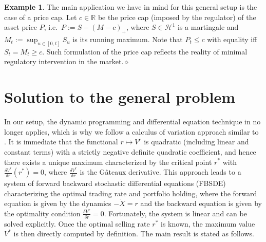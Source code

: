 \documentclass[openany,oneside]{article}
\theoremstyle{definition}
\newtheorem{eg}[thm]{Example}
\theoremstyle{remark}
\newcommand{\close}{\hspace*{\fill}$\diamond$}
\begin{document}
\begin{eg}
The main application we have in mind for this general setup is the case of a price cap. Let $c\in\mathbb{R}$ be the price cap (imposed by the regulator) of the asset price $P$, i.e.\ $P:=S-(M-c)_+$, where $S\in\mathcal{H}^1$ is a martingale and $M_t:=\sup_{u\in[0,t]} S_u$ is its running maximum. Note that $P_t\le c$ with equality iff $S_t=M_t\ge c$. Such formulation of the price cap reflects the reality of minimal regulatory intervention in the market.\close
\end{eg}


\section{Solution to the general problem}
In our setup, the dynamic programming and differential equation technique in \cite{lehalle2017incorporating} no longer applies, which is why we follow a calculus of variation approach similar to \cite{bouchard2017equilibrium}. It is immediate that the functional $r\mapsto V^r$ is quadratic (including linear and constant terms) with a strictly negative definite quadratic coefficient, and hence there exists a unique maximum characterized by the critical point $r^\ast$ with $\frac{\delta V^r}{\delta r}(r^\ast) =0$, where $\frac{\delta V^r}{\delta r}$ is the G\^ateaux derivative. This approach leads to a system of forward backward stochastic differential equations (FBSDE) characterizing the optimal trading rate and portfolio holding, where the forward equation is given by the dynamics $-\dot{X}=r$ and the backward equation is given by the optimality condition $\frac{\delta V^r}{\delta r}=0$. Fortunately, the system is linear and can be solved explicitly. Once the optimal selling rate $r^\ast$ is known, the maximum value $V^\ast$ is then directly computed by definition. The main result is stated as follows.
\end{document}
